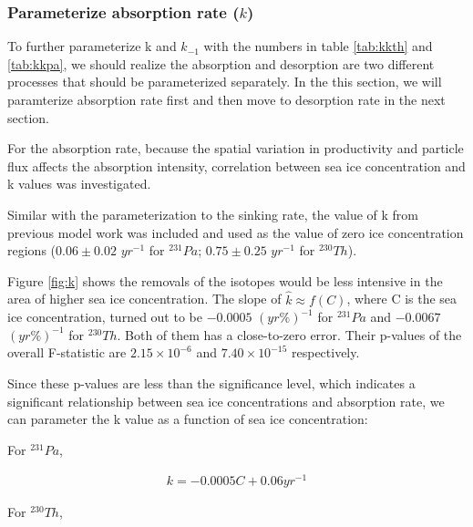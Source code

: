 \documentclass[paper=a4, fontsize=11pt]{scrartcl} %
\numberwithin{equation}{section} %
\numberwithin{figure}{section} %
\numberwithin{table}{section} %
\begin{document}
\subsubsection{Parameterize absorption rate ($k$)}

To further parameterize k and ${k_{-1}}$ with the numbers in table \ref{tab:kkth} and \ref{tab:kkpa}, we should realize the absorption and desorption are two different processes that should be parameterized separately.  In the this section, we will paramterize absorption rate first and then move to desorption rate in the next section.

For the absorption rate, because the spatial variation in productivity and particle flux affects the absorption intensity, correlation between sea ice concentration and k values was investigated. 

Similar with the parameterization to the sinking rate, the value of k from previous model work was included and used as the value of zero ice concentration regions ($0.06\pm0.02$ $yr^{-1}$ for $^{231}Pa$; $0.75\pm0.25$ $yr^{-1}$ for $^{230}Th$). 

Figure \ref{fig:k} shows the removals of the isotopes would be less intensive in the area of higher sea ice concentration. The slope of $\hat{k}\approx f\left(C\right)$,  where C is the sea ice concentration, turned out to be $-0.0005$ $(yr\%)^{-1}$ for $^{231}Pa$ and $-0.0067$  $(yr\%)^{-1}$ for $^{230}Th$. Both of them has a close-to-zero error. Their p-values of the overall F-statistic are $2.15\times 10^{-6}$ and $7.40\times 10^{-15}$ respectively. 

Since these p-values are less than the significance level, which indicates a significant relationship between sea ice concentrations and absorption rate, we can parameter the k value as a function of sea ice concentration:


For $^{231}Pa$, 

\begin{align}
\label{eq:para_k_pa}
k=-0.0005C+0.06yr^{-1}
\end{align}

For $^{230}Th$, 
\end{document}
